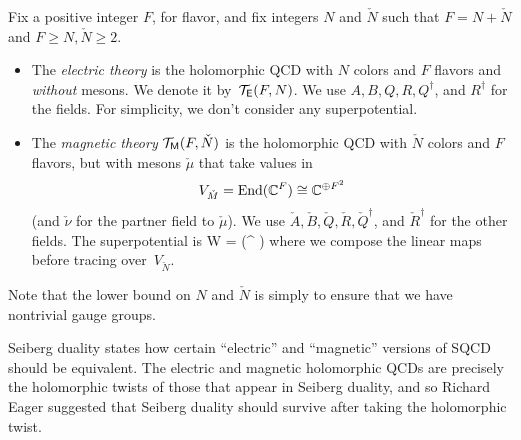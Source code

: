 \documentclass[11pt]{amsart}
\def\SU{{\rm SU}}
\def\til{\Tilde}
\begin{document}
\begin{dfn}
Fix a positive integer $F$, for flavor, and fix integers $N$ and $\check{N}$ such that $F = N + \check{N}$ and $F \geq N, \check{N} \geq 2$.
\begin{itemize}
\item
The {\em electric theory} is the holomorphic QCD with $N$ colors and $F$ flavors and {\em without} mesons.
We denote it by~$\mathcal T_{\mathsf E}(F, N)$.
We use $A, B, Q, R, Q^\dag$, and $R^\dag$ for the fields.
For simplicity, we don't consider any superpotential.
\item
The {\em magnetic theory} $\mathcal T_{{\sf M}}(F, \check{N})$ is the holomorphic QCD with $\check{N}$ colors and $F$ flavors, but with mesons $\check{\mu}$ that take values in $$V_{\check{M}} = {\rm End}(\mathbb C^F) \cong \mathbb C^{\oplus F^2}$$
(and $\check{\nu}$ for the partner field to $\check{\mu}$).
We use $\check{A}, \check{B}, \check{Q}, \check{R}, \check{Q}^\dag$, and $\check{R}^\dag$ for the other fields.
The superpotential is 
\beqn\label{eqn:checkW}
\til W =  \Tr(^\dag \check{\mu}  )
\eeqn
where we compose the linear maps before tracing over~$V_{\check{N}}$.
\end{itemize}
\end{dfn}


Note that the lower bound on $N$ and $\check{N}$ is simply to ensure that we have nontrivial gauge groups.


Seiberg duality states how certain ``electric'' and ``magnetic'' versions of SQCD should be equivalent.
The electric and magnetic holomorphic QCDs are precisely the holomorphic twists of those that appear in Seiberg duality,
and so Richard Eager suggested that Seiberg duality should survive after taking the holomorphic twist.
\end{document}
